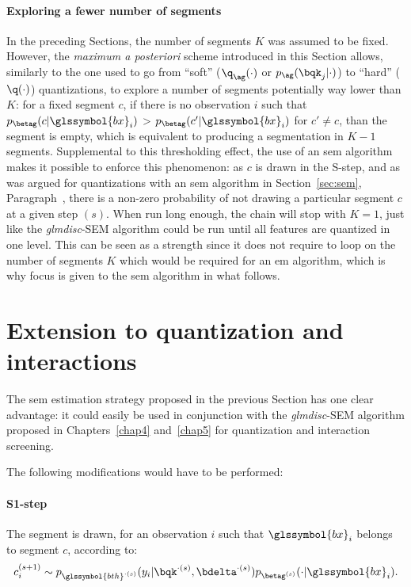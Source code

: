 \paragraph{Exploring a fewer number of segments}
In the preceding Sections, the number of segments $K$ was assumed to be fixed. However, the \textit{maximum a posteriori} scheme introduced in this Section allows, similarly to the one used to go from ``soft'' ($\q_{\ag}(\cdot)$ or $p_{\ag}(\bqk_j | \cdot)$) to ``hard'' ($\q(\cdot)$) quantizations, to explore a number of segments potentially way lower than $K$: for a fixed segment $c$, if there is no observation $i$ such that $p_{\betag}(c | \glssymbol{bx}_i)$ > $p_{\betag}(c' | \glssymbol{bx}_i)$ for $c' \neq c$, than the segment is empty, which is equivalent to producing a segmentation in $K-1$ segments. Supplemental to this thresholding effect, the use of an \gls{sem} algorithm makes it possible to enforce this phenomenon: as $c$ is drawn in the S-step, and as was argued for quantizations with an \gls{sem} algorithm in Section~\ref{sec:sem}, Paragraph~, there is a non-zero probability of not drawing a particular segment $c$ at a given step $(s)$. When run long enough, the chain will stop with $K = 1$, just like the \textit{glmdisc}-SEM algorithm could be run until all features are quantized in one level. This can be seen as a strength since it does not require to loop on the number of segments $K$ which would be required for an \gls{em} algorithm, which is why focus is given to the \gls{sem} algorithm in what follows.


\section{Extension to quantization and interactions}

The \gls{sem} estimation strategy proposed in the previous Section has one clear advantage: it could easily be used in conjunction with the \textit{glmdisc}-SEM algorithm proposed in Chapters~\ref{chap4} and~\ref{chap5} for quantization and interaction screening.

The following modifications would have to be performed:
\paragraph{S1-step} The segment is drawn, for an observation $i$ such that $\glssymbol{bx}_i$ belongs to segment $c$, according to:
\[ c_i^{(s+1)} \sim p_{\glssymbol{bth}^{\cdot(s)}}(y_i | \bqk^{\cdot(s)},\bdelta^{\cdot(s)}) p_{\betag^{(s)}}(\cdot | \glssymbol{bx}_i). \]

